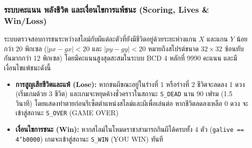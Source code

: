 \subsubsection{ระบบคะแนน พลังชีวิต และเงื่อนไขการแพ้ชนะ (Scoring, Lives \& Win/Loss)}

ระบบตรวจสอบการชนระหว่างสไลม์กับผีแต่ละตัวที่ยังมีชีวิตอยู่ด้วยระยะห่างแกน $X$ และแกน $Y$ น้อยกว่า 20 พิกเซล ($|px - gx| < 20$ และ $|py - gy| < 20$ หมายถึงสไปรต์ขนาด $32\times32$ ซ้อนทับกันมากกว่า 12 พิกเซล) โดยมีคะแนนสูงสุดสะสมในระบบ BCD 4 หลักที่ 9990 คะแนน และมีเงื่อนไขแพ้ชนะดังนี้
\begin{itemize}[leftmargin=1.5cm]
    \item \textbf{การสูญเสียชีวิตและแพ้ (Lose):} หากชนผีขณะอยู่ในร่างที่ 1 หรือร่างที่ 2 ชีวิตจะลดลง 1 ดวง (เริ่มเกมด้วย 3 ชีวิต) และเกมจะหยุดค้างชั่วคราวในสถานะ \texttt{S\_DEAD} นาน 90 เฟรม (1.5 วินาที) โดยแสดงท่าตายก่อนรีเซ็ตตำแหน่งสไลม์และผีเพื่อเล่นต่อ หากชีวิตลดลงเหลือ 0 ดวง จะเข้าสู่สถานะ \texttt{S\_OVER} (GAME OVER)
    \item \textbf{เงื่อนไขการชนะ (Win):} หากสไลม์ในโหมดราชาสามารถกินผีได้ครบทั้ง 4 ตัว (\texttt{galive == 4'b0000}) เกมจะเข้าสู่สถานะ \texttt{S\_WIN} (YOU WIN) ทันที
\end{itemize}

